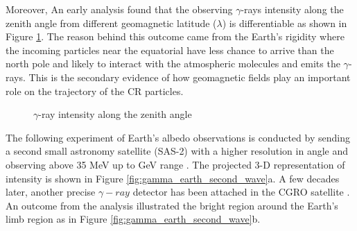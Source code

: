 Moreover, An early analysis found 
that the observing $\gamma$-rays intensity along the zenith angle
from different geomagnetic latitude ($\lambda$) is differentiable
as shown in Figure \ref{fig:explorer_xi_zenith}. The reason behind 
this outcome came from the Earth's rigidity where the incoming 
particles near the equatorial have less chance to arrive than the 
north pole and likely to interact with the atmospheric molecules 
and emits the $\gamma$-rays. This is the secondary 
evidence of how geomagnetic fields play an important role on the 
trajectory of the CR particles. 

\begin{figure}[h!]
    \centering
        \hfill
        \caption{
            $\gamma$-ray intensity along the zenith angle
            \citep{kraushaar1965explorer}
        }
       \label{fig:explorer_xi_zenith}
\end{figure}

The following experiment of Earth's albedo observations is conducted 
by sending a second small astronomy satellite (SAS-2) with a higher 
resolution in angle and observing above 35 MeV up to GeV range
\citep{Thompson81}. The projected 3-D representation of intensity
is shown in Figure \ref{fig:gamma_earth_second_wave}a. A few decades 
later, another precise $\gamma-ray$ detector has been attached in the 
CGRO satellite \citep{Petry05}. An outcome from the analysis illustrated the bright region around the Earth's limb region as 
in Figure \ref{fig:gamma_earth_second_wave}b.


